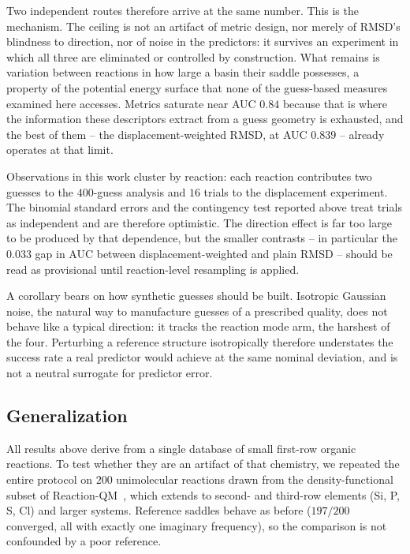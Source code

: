 \documentclass[11pt]{article}
\begin{document}
Two independent routes therefore arrive at the same number. This is the
mechanism. The ceiling is not an artifact of metric design, nor merely of RMSD's
blindness to direction, nor of noise in the predictors: it survives an experiment
in which all three are eliminated or controlled by construction. What remains is
variation between reactions in how large a basin their saddle
possesses, a property of the potential energy surface that none of the
guess-based measures examined here accesses. Metrics saturate near AUC $0.84$
because that is where the information these descriptors extract from a guess
geometry is exhausted, and the best of them -- the displacement-weighted RMSD, at
AUC $0.839$ -- already operates at that limit.

Observations in this work cluster by reaction: each reaction contributes two
guesses to the $400$-guess analysis and $16$ trials to the displacement
experiment. The binomial standard errors and the contingency test reported above
treat trials as independent and are therefore optimistic. The direction effect is
far too large to be produced by that dependence, but the smaller contrasts -- in
particular the $0.033$ gap in AUC between displacement-weighted and plain
RMSD -- should be read as provisional until reaction-level resampling is applied.

A corollary bears on how synthetic guesses should be built. Isotropic Gaussian
noise, the natural way to manufacture guesses of a prescribed quality, does not
behave like a typical direction: it tracks the reaction mode arm, the
harshest of the four. Perturbing a reference structure isotropically therefore
understates the success rate a real predictor would achieve at the same nominal
deviation, and is not a neutral surrogate for predictor error.

\subsection{Generalization}
\label{sec:rqm}
All results above derive from a single database of small first-row organic
reactions. To test whether they are an artifact of that chemistry, we repeated the
entire protocol on $200$ unimolecular reactions drawn from the density-functional
subset of Reaction-QM~\cite{ReactionQM2026}, which extends to second- and
third-row elements (Si, P, S, Cl) and larger systems. Reference saddles behave as
before ($197/200$ converged, all with exactly one imaginary frequency), so
the comparison is not confounded by a poor reference.
\end{document}
